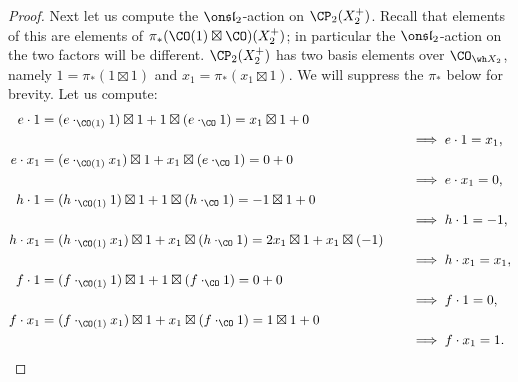 \documentclass[11pt,reqno]{amsart}
\begin{document}
\begin{proof}
    Next let us compute the $\sl_2$-action on $\CP_2(X_2^+)$. Recall that elements of this are elements of $\pi_*(\CO(1)\boxtimes\CO)(X_2^+)$; in particular the $\sl_2$-action on the two factors will be different. $\CP_2(X_2^+)$ has two basis elements over $\CO_{\wh X_2}$, namely $1=\pi_*(1\boxtimes 1)$ and $x_1=\pi_*(x_1\boxtimes 1)$. We will suppress the $\pi_*$ below for brevity. Let us compute:
    \begin{align*}
        e\cdot 1&=(e\cdot_{\CO(1)} 1)\boxtimes 1+1\boxtimes (e\cdot_{\CO} 1)=x_1\boxtimes1+0\\
        &\hspace*{275pt}\implies e\cdot 1=x_1,\\ 
        e\cdot x_1&=(e\cdot_{\CO(1)} x_1)\boxtimes 1+x_1\boxtimes (e\cdot_{\CO} 1)=0+0\\
        &\hspace*{275pt}\implies e\cdot x_1=0,\\
        h\cdot 1&=(h\cdot_{\CO(1)} 1)\boxtimes 1+1\boxtimes (h\cdot_{\CO} 1)=-1\boxtimes 1+0\\
        &\hspace*{275pt}\implies h\cdot 1=-1,\\
        h\cdot x_1&=(h\cdot_{\CO(1)} x_1)\boxtimes 1+x_1\boxtimes (h\cdot_{\CO} 1)=2x_1\boxtimes 1+x_1\boxtimes (-1)\\
        &\hspace*{275pt}\implies h\cdot x_1=x_1,\\
        f\cdot 1&=(f\cdot_{\CO(1)} 1)\boxtimes 1+1\boxtimes (f\cdot_{\CO} 1)=0+0\\
        &\hspace*{275pt}\implies f\cdot 1=0,\\
        f\cdot x_1&=(f\cdot_{\CO(1)} x_1)\boxtimes 1+x_1\boxtimes (f\cdot_{\CO} 1)=1\boxtimes 1+0\\
        &\hspace*{275pt}\implies f\cdot x_1=1.
    \end{align*}
    

\end{proof}
\end{document}
